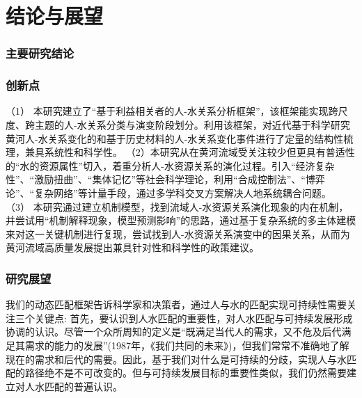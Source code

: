 \chapter{结论与展望}

\subsection{主要研究结论}

\subsection{创新点}
（1） 本研究建立了“基于利益相关者的人-水关系分析框架”，该框架能实现跨尺度、跨主题的人-水关系分类与演变阶段划分。利用该框架，对近代基于科学研究黄河人-水关系变化的和基于历史材料的人-水关系变化事件进行了定量的结构性梳理，兼具系统性和科学性。
（2）本研究从在黄河流域受关注较少但更具有普适性的“水的资源属性”切入，着重分析人-水资源关系的演化过程。引入“经济复杂性”、“激励扭曲”、“集体记忆”等社会科学理论，利用“合成控制法”、“博弈论”、“复杂网络”等计量手段，通过多学科交叉方案解决人地系统耦合问题。
（3） 本研究通过建立机制模型，找到流域人-水资源关系演化现象的内在机制，并尝试用“机制解释现象，模型预测影响”的思路，通过基于复杂系统的多主体建模来对这一关键机制进行复现，尝试找到人-水资源关系演变中的因果关系，从而为黄河流域高质量发展提出兼具针对性和科学性的政策建议。

\subsection{研究展望}

我们的动态匹配框架告诉科学家和决策者，通过人与水的匹配实现可持续性需要关注三个关键点:
首先，要认识到人水匹配的重要性，对人水匹配与可持续发展形成协调的认识。尽管一个众所周知的定义是“既满足当代人的需求，又不危及后代满足其需求的能力的发展”(1987年，《我们共同的未来》)，但我们常常不准确地了解现在的需求和后代的需要。因此，基于我们对什么是可持续的分歧，实现人与水匹配的路径绝不是不可改变的。但与可持续发展目标的重要性类似，我们仍然需要建立对人水匹配的普遍认识。

